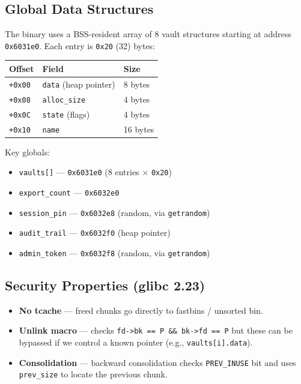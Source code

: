 \documentclass[12pt,a4paper]{article}
\begin{document}
\subsection{Global Data Structures}

The binary uses a BSS-resident array of 8 vault structures starting at
address \texttt{0x6031e0}. Each entry is \texttt{0x20} (32) bytes:

\begin{center}
\begin{tabular}{lll}
\toprule
\textbf{Offset} & \textbf{Field} & \textbf{Size} \\
\midrule
\texttt{+0x00} & \texttt{data} (heap pointer) & 8 bytes \\
\texttt{+0x08} & \texttt{alloc\_size}          & 4 bytes \\
\texttt{+0x0C} & \texttt{state} (flags)        & 4 bytes \\
\texttt{+0x10} & \texttt{name}                 & 16 bytes \\
\bottomrule
\end{tabular}
\end{center}

Key globals:
\begin{itemize}[nosep]
  \item \texttt{vaults[]} — \texttt{0x6031e0} (8 entries $\times$ \texttt{0x20})
  \item \texttt{export\_count} — \texttt{0x6032e0}
  \item \texttt{session\_pin} — \texttt{0x6032e8} (random, via \texttt{getrandom})
  \item \texttt{audit\_trail} — \texttt{0x6032f0} (heap pointer)
  \item \texttt{admin\_token} — \texttt{0x6032f8} (random, via \texttt{getrandom})
\end{itemize}

\subsection{Security Properties (glibc 2.23)}

\begin{itemize}[nosep]
  \item \textbf{No tcache} — freed chunks go directly to fastbins / unsorted bin.
  \item \textbf{Unlink macro} — checks \texttt{fd->bk == P \&\& bk->fd == P} but
        these can be bypassed if we control a known pointer (e.g., \texttt{vaults[i].data}).
  \item \textbf{Consolidation} — backward consolidation checks \texttt{PREV\_INUSE} bit
        and uses \texttt{prev\_size} to locate the previous chunk.
\end{itemize}
\end{document}
